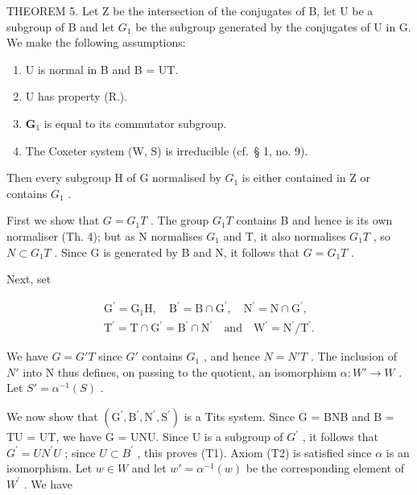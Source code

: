 THEOREM 5. Let Z be the intersection of the conjugates of B, let U be a subgroup of B and let \(G_{1}\) be the subgroup generated by the conjugates of U in G. We make the following assumptions:

\begin{enumerate}
\def\labelenumi{(\arabic{enumi})}
\item
  U is normal in B and B = UT.
\item
  U has property (R.).
\item
  \(\mathbf{G}_1\) is equal to its commutator subgroup.
\item
  The Coxeter system (W, S) is irreducible (cf.~§ 1, no. 9).
\end{enumerate}

Then every subgroup H of G normalised by \(G_{1}\) is either contained in Z or contains \(G_{1}\) .

First we show that \(G = G_{1}T\) . The group \(G_{1}T\) contains B and hence is its own normaliser (Th. 4); but as N normalises \(G_{1}\) and T, it also normalises \(G_{1}T\) , so \(N \subset G_{1}T\) . Since G is generated by B and N, it follows that \(G = G_{1}T\) .

Next, set

\[
\begin{array}{c} \mathrm{G} ^ {\prime} = \mathrm{G} _ {1} \mathrm{H}, \quad \mathrm{B} ^ {\prime} = \mathrm{B} \cap \mathrm{G} ^ {\prime}, \quad \mathrm{N} ^ {\prime} = \mathrm{N} \cap \mathrm{G} ^ {\prime}, \\ \mathrm{T} ^ {\prime} = \mathrm{T} \cap \mathrm{G} ^ {\prime} = \mathrm{B} ^ {\prime} \cap \mathrm{N} ^ {\prime} \quad \text {and} \quad \mathrm{W} ^ {\prime} = \mathrm{N} ^ {\prime} / \mathrm{T} ^ {\prime}. \end{array}
\]

We have \(G = G'T\) since \(G'\) contains \(G_{1}\) , and hence \(N = N'T\) . The inclusion of \(N'\) into N thus defines, on passing to the quotient, an isomorphism \(\alpha : W' \to W\) . Let \(S' = \alpha^{-1}(S)\) .

We now show that \((\mathrm{G}^{\prime},\mathrm{B}^{\prime},\mathrm{N}^{\prime},\mathrm{S}^{\prime})\) is a Tits system. Since G = BNB and B = TU = UT, we have G = UNU. Since U is a subgroup of \(G^{\prime}\) , it follows that \(G^{\prime} = UN^{\prime}U\) ; since \(U \subset B^{\prime}\) , this proves (T1). Axiom (T2) is satisfied since \(\alpha\) is an isomorphism. Let \(w \in W\) and let \(w' = \alpha^{-1}(w)\) be the corresponding element of \(W^{\prime}\) . We have

